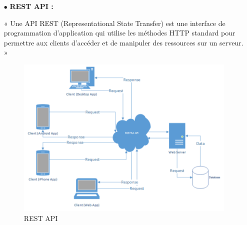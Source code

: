 \begin{itemize}
\begin{figure}[ht]
          \end{figure}

          \bigskip
    \item[$\bullet$] \textbf{  REST API :}
          \par« Une API REST (Representational State Transfer) est une interface de programmation d'application qui utilise les méthodes HTTP standard pour permettre aux clients d'accéder et de manipuler des ressources sur un serveur. »

          \begin{figure}[ht]
              \centering\includegraphics[scale=0.45]{chap1.images/rest-api-flow.png}
              \caption{REST API}
              \label{RESTAPI}
          \end{figure}

\end{itemize}


\newpage
